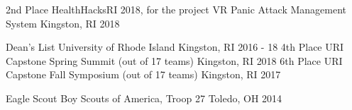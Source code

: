 \gradheader
\begin{cvhonors}
  \cvhonor
    {2nd Place}
    {HealthHacksRI 2018, for the project VR Panic Attack Management System}
    {Kingston, RI}
    {2018}
\end{cvhonors}

\ugradheader
\begin{cvhonors}
  \cvhonor
    {Dean's List}
    {University of Rhode Island}
    {Kingston, RI}
    {2016 - 18}
  \cvhonor
    {4th Place}
    {URI Capstone Spring Summit (out of 17 teams)}
    {Kingston, RI}
    {2018}
  \cvhonor
    {6th Place}
    {URI Capstone Fall Symposium (out of 17 teams)}
    {Kingston, RI}
    {2017}
\end{cvhonors}
\otherheader
\begin{cvhonors}
  \cvhonor
  {Eagle Scout}
  {Boy Scouts of America, Troop 27}
  {Toledo, OH}
  {2014}
\end{cvhonors}
